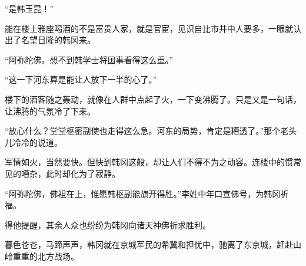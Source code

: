 “是韩玉昆！”

能在楼上雅座喝酒的不是富贵人家，就是官宦，见识自比市井中人要多，一眼就认出了名望日隆的韩冈来。

“阿弥陀佛。想不到韩学士将国事看得这么重。”

“这一下河东算是能让人放下一半的心了。”

楼下的酒客随之轰动，就像在人群中点起了火，一下变沸腾了。只是又是一句话，让沸腾的气氛冷了下来。

“放心什么？堂堂枢密副使也走得这么急。河东的局势，肯定是糟透了。”那个老头儿冷冷的说道。

军情如火，当然要快。但快到韩冈这般，却让人们不得不为之动容。连楼中的惯常见的嘈杂，此时却化为了寂静。

“阿弥陀佛，佛祖在上，惟愿韩枢副能旗开得胜。”李姓中年口宣佛号，为韩冈祈福。

得他提醒，其余人众也纷纷为韩冈向诸天神佛祈求胜利。

暮色苍苍，马蹄声声，韩冈就在京城军民的希冀和担忧中，驰离了东京城，赶赴山岭重重的北方战场。

